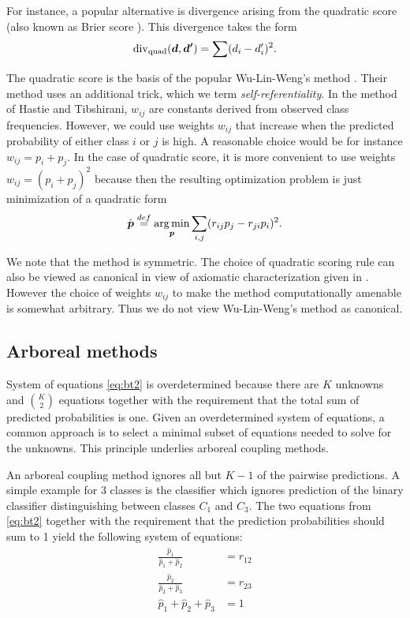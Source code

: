 For instance, a popular alternative is divergence arising from the quadratic  score \cite{gneiting2007strictly} (also known as Brier score \cite{brier1950verification}). This divergence takes the form
$$
\operatorname*{div}\nolimits_\textrm{quad} (\boldsymbol{d}, \boldsymbol{d'})= \sum (d_i - d'_i)^2.
$$

The quadratic score is the basis of the popular Wu-Lin-Weng's method \cite{wu2004probability}. 
Their method uses an additional trick, which we term \emph{self-referentiality}. In the method of Hastie and Tibshirani, $w_{ij}$ are constants derived from observed class frequencies. However, we could use weights $w_{ij}$ that increase when the predicted probability of either class $i$ or $j$ is high. A reasonable choice would be for instance $w_{ij}= p_i + p_j$. In the case of quadratic score, it is more convenient to use weights $w_{ij} = (p_i + p_j)^2$ because then the resulting optimization problem is just minimization of a quadratic form
\begin{align*}
\hat{\boldsymbol{p}} \stackrel{def}{=} \operatorname*{arg\,min}_{\boldsymbol{p}} \sum_{i,j} (r_{ij}p_j - r_{ji}p_i)^2.
\end{align*}

We note that the method is symmetric. The choice of quadratic scoring rule can also be viewed as canonical in view of axiomatic characterization given in  \cite{selten1998axiomatic}.  However the choice of weights $w_{ij}$ to make the method computationally amenable is somewhat arbitrary. Thus we do not view Wu-Lin-Weng's method as canonical.

\subsection{Arboreal methods}

System of equations \eqref{eq:bt2} is overdetermined because there are $K$ unknowns and $\binom{K}{2}$ equations together with the requirement that the total sum of predicted probabilities is one.  Given an overdetermined system of equations, a common approach is to select a minimal subset of equations needed to solve for the unknowns. This principle underlies arboreal coupling methods.

An arboreal coupling method ignores all but $K-1$ of the pairwise predictions. A simple example for 3 classes is the classifier which ignores prediction of the binary classifier distinguishing between classes $C_1$ and $C_3$. The two equations from \eqref{eq:bt2} together with the requirement that the prediction probabilities should sum to 1 yield the following system of equations:
\begin{equation}
	\begin{split}
		\frac{\hat p_1}{\hat p_1 + \hat p_2} &= {r}_{12}\\
		\frac{\hat p_2}{\hat p_2 + \hat p_3} &= {r}_{23}\\
		\hat p_1 + \hat p_2 + \hat p_3 &= 1
	\end{split}
	\label{eq:arb1}
\end{equation}

